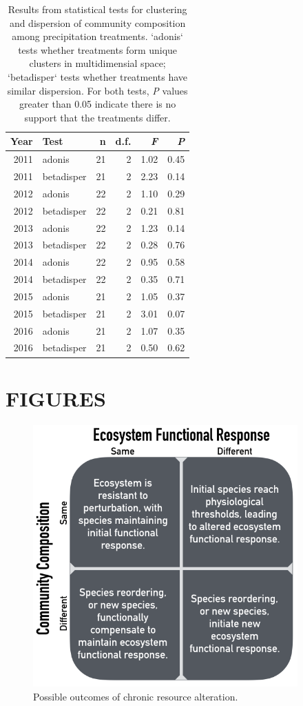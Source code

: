 \documentclass[fleqn,10pt,lineno]{wlpeerj} %
\begin{document}
\begin{table}[ht]
\centering
\caption{Results from statistical tests for clustering and dispersion of community composition among precipitation treatments. `adonis` tests whether treatments form unique clusters in multidimensial space; `betadisper` tests whether treatments have similar dispersion. For both tests, \emph{P} values greater than 0.05 indicate there is no support that the treatments differ.} 
\begingroup\normalsize
\begin{tabular}{rlrrrr}
  \hline
Year & Test & n & d.f. & \emph{F} & \emph{P} \\ 
  \hline
2011 & adonis &  21 &   2 & 1.02 & 0.45 \\ 
  2011 & betadisper &  21 &   2 & 2.23 & 0.14 \\ 
  2012 & adonis &  22 &   2 & 1.10 & 0.29 \\ 
  2012 & betadisper &  22 &   2 & 0.21 & 0.81 \\ 
  2013 & adonis &  22 &   2 & 1.23 & 0.14 \\ 
  2013 & betadisper &  22 &   2 & 0.28 & 0.76 \\ 
  2014 & adonis &  22 &   2 & 0.95 & 0.58 \\ 
  2014 & betadisper &  22 &   2 & 0.35 & 0.71 \\ 
  2015 & adonis &  21 &   2 & 1.05 & 0.37 \\ 
  2015 & betadisper &  21 &   2 & 3.01 & 0.07 \\ 
  2016 & adonis &  21 &   2 & 1.07 & 0.35 \\ 
  2016 & betadisper &  21 &   2 & 0.50 & 0.62 \\ 
   \hline
\end{tabular}
\endgroup
\end{table}

\newpage{}

\section{FIGURES}\label{figures}

\begin{figure}[!ht]
  \centering
      \includegraphics[width=4in]{../figures/hypothesis_figtable.png}
  \caption{Possible outcomes of chronic resource alteration.}
\end{figure}
\end{document}
